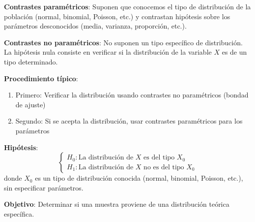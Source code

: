 \documentclass[10pt,a4paper]{article}
\begin{document}
\pagebreak


\begin{tcolorbox}[title=Contrastes Paramétricos vs No Paramétricos]
    \textbf{Contrastes paramétricos}: Suponen que conocemos el tipo de distribución de la población (normal, binomial, Poisson, etc.) y contrastan hipótesis sobre los parámetros desconocidos (media, varianza, proporción, etc.).
    
    \textbf{Contrastes no paramétricos}: No suponen un tipo específico de distribución. La hipótesis nula consiste en verificar si la distribución de la variable $X$ es de un tipo determinado.
    
    \textbf{Procedimiento típico}:
    \begin{enumerate}
        \item Primero: Verificar la distribución usando contrastes no paramétricos (bondad de ajuste)
        \item Segundo: Si se acepta la distribución, usar contrastes paramétricos para los parámetros
    \end{enumerate}
\end{tcolorbox}

\begin{tcolorbox}[title=Contraste de Bondad de Ajuste]
    \textbf{Hipótesis}:
    \[
        \begin{cases}
        H_0: \text{La distribución de } X \text{ es del tipo } X_0 \\
        H_1: \text{La distribución de } X \text{ no es del tipo } X_0
        \end{cases}
    \]
    donde $X_0$ es un tipo de distribución conocida (normal, binomial, Poisson, etc.), sin especificar parámetros.
    
    \textbf{Objetivo}: Determinar si una muestra proviene de una distribución teórica específica.
\end{tcolorbox}

\end{document}
